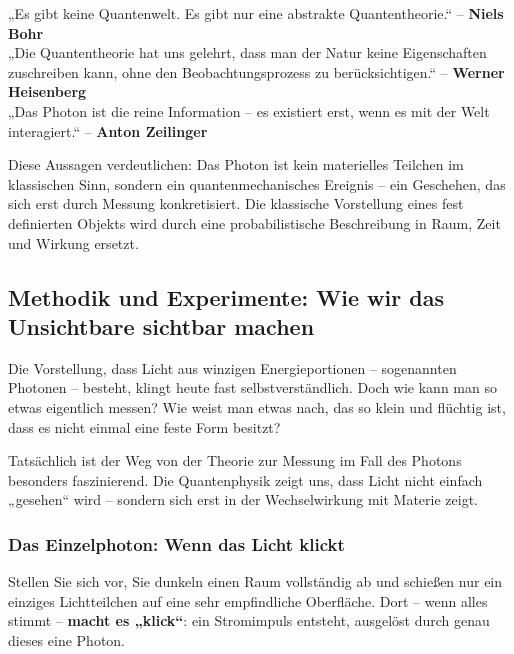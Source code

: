 \vspace{1em}

\begin{tcolorbox}[didaktikbox, title=Was ist Realität in der Quantenphysik?]
	\label{box:realitaet}
	„Es gibt keine Quantenwelt. Es gibt nur eine abstrakte Quantentheorie.“ – \textbf{Niels Bohr} \cite{bohr1934} \\
	„Die Quantentheorie hat uns gelehrt, dass man der Natur keine Eigenschaften zuschreiben kann, ohne den Beobachtungsprozess zu berücksichtigen.“ – \textbf{Werner Heisenberg} \cite{heisenberg1959} \\
	„Das Photon ist die reine Information – es existiert erst, wenn es mit der Welt interagiert.“ – \textbf{Anton Zeilinger} \cite{zeilinger2005}
\end{tcolorbox}

\vspace{1em}

Diese Aussagen verdeutlichen: Das Photon ist kein materielles Teilchen im klassischen Sinn, sondern ein quantenmechanisches Ereignis – ein Geschehen, das sich erst durch Messung konkretisiert. Die klassische Vorstellung eines fest definierten Objekts wird durch eine probabilistische Beschreibung in Raum, Zeit und Wirkung ersetzt.



\subsection{Methodik und Experimente: Wie wir das \newline Unsichtbare sichtbar machen}

Die Vorstellung, dass Licht aus winzigen Energieportionen – sogenannten Photonen – besteht, klingt heute fast selbstverständlich. Doch wie kann man so etwas eigentlich messen? Wie weist man etwas nach, das so klein und flüchtig ist, dass es nicht einmal eine feste Form besitzt?

Tatsächlich ist der Weg von der Theorie zur Messung im Fall des Photons besonders faszinierend. Die Quantenphysik zeigt uns, dass Licht nicht einfach „gesehen“ wird – sondern sich erst in der Wechselwirkung mit Materie zeigt.

\subsubsection{Das Einzelphoton: Wenn das Licht klickt}
Stellen Sie sich vor, Sie dunkeln einen Raum vollständig ab und schießen nur ein einziges Lichtteilchen auf eine sehr empfindliche Oberfläche. Dort – wenn alles stimmt – \textbf{macht es „klick“}: ein Stromimpuls entsteht, ausgelöst durch genau dieses eine Photon.

